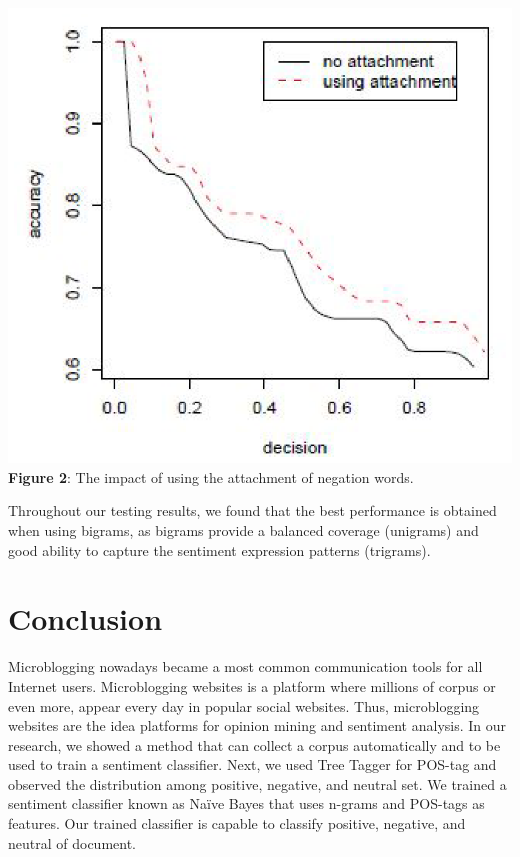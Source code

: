 \documentclass[a4paper,12pt]{article}
\begin{document}
\begin{center}
\includegraphics[scale=0.5]{graphs.eps}
\linebreak
\linebreak
\textbf{Figure 2}: The impact of using the attachment of negation words.
\end{center}

Throughout our testing results, we found that the best performance is obtained when using bigrams, as bigrams provide a balanced coverage (unigrams) and good ability to capture the sentiment expression patterns (trigrams).

\section*{\textbf{Conclusion}}
Microblogging nowadays became a most common communication tools for all Internet users. Microblogging websites is a platform where millions of corpus or even more, appear every day in popular social websites. Thus, microblogging websites are the idea platforms for opinion mining and sentiment analysis. In our research, we showed a method that can collect a corpus automatically and to be used to train a sentiment classifier. Next, we used Tree Tagger for POS-tag and observed the distribution among positive, negative, and neutral set. We trained a sentiment classifier known as Naïve Bayes that uses n-grams and POS-tags as features. Our trained classifier is capable to classify positive, negative, and neutral of document. 
\end{document}
